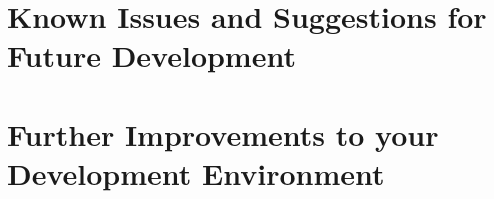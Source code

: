 \documentclass[a4paper, 12pt, titlepage, headsepline, listof = totoc, bibliography = totoc, numbers = noenddot]{scrbook} %
\begin{document}
\chapter{Known Issues and Suggestions for Future Development}


\chapter{Further Improvements to your Development Environment}




\setcounter{secnumdepth}{0}





%
%

\end{document}
